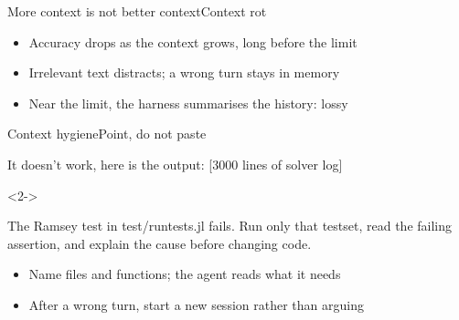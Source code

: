\begin{frame}{More context is not better context}{Context rot}
  \begin{itemize}
    \item Accuracy drops as the context grows, long before the limit
    \item Irrelevant text distracts; a wrong turn stays in memory
    \item<2-> Near the limit, the harness summarises the history: lossy
  \end{itemize}

  \vspace{3ex}

  \slidecite{\citeContextRot}
\end{frame}

\begin{frame}[fragile]{Context hygiene}{Point, do not paste}
\begin{prompt}
It doesn't work, here is the output: [3000 lines of solver log]
\end{prompt}
\begin{onlyenv}<2->
\begin{prompt}
The Ramsey test in test/runtests.jl fails. Run only that testset,
read the failing assertion, and explain the cause before changing code.
\end{prompt}
\end{onlyenv}
  \begin{itemize}
    \item<3-> Name files and functions; the agent reads what it needs
    \item<3-> After a wrong turn, start a new session rather than arguing
  \end{itemize}
\end{frame}

